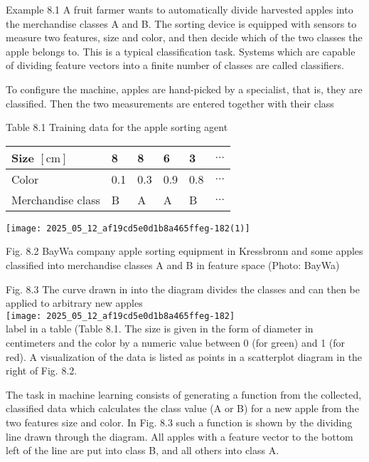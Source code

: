 \documentclass[10pt]{article}
\begin{document}
Example 8.1 A fruit farmer wants to automatically divide harvested apples into the merchandise classes A and B. The sorting device is equipped with sensors to measure two features, size and color, and then decide which of the two classes the apple belongs to. This is a typical classification task. Systems which are capable of dividing feature vectors into a finite number of classes are called classifiers.

To configure the machine, apples are hand-picked by a specialist, that is, they are classified. Then the two measurements are entered together with their class

Table 8.1 Training data for the apple sorting agent

\begin{center}
\begin{tabular}{llllll}
\hline
Size $[\mathrm{cm}]$ & 8 & 8 & 6 & 3 & $\ldots$ \\
\hline
Color & 0.1 & 0.3 & 0.9 & 0.8 & $\ldots$ \\
\hline
Merchandise class & B & A & A & B & $\ldots$ \\
\hline
\end{tabular}
\end{center}

\begin{center}
\texttt{[image: 2025\_05\_12\_af19cd5e0d1b8a465ffeg-182(1)]}
\end{center}

Fig. 8.2 BayWa company apple sorting equipment in Kressbronn and some apples classified into merchandise classes A and B in feature space (Photo: BayWa)

Fig. 8.3 The curve drawn in into the diagram divides the classes and can then be applied to arbitrary new apples\\
\texttt{[image: 2025\_05\_12\_af19cd5e0d1b8a465ffeg-182]}\\
label in a table (Table 8.1. The size is given in the form of diameter in centimeters and the color by a numeric value between 0 (for green) and 1 (for red). A visualization of the data is listed as points in a scatterplot diagram in the right of Fig. 8.2.

The task in machine learning consists of generating a function from the collected, classified data which calculates the class value (A or B) for a new apple from the two features size and color. In Fig. 8.3 such a function is shown by the dividing line drawn through the diagram. All apples with a feature vector to the bottom left of the line are put into class B, and all others into class A.
\end{document}

